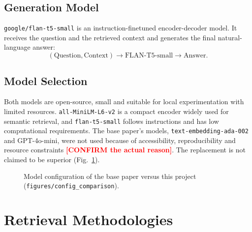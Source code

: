 \documentclass[conference]{IEEEtran}
\newcommand{\ph}[1]{\textbf{\textcolor{red}{[#1]}}}
\begin{document}
\subsection{Generation Model}
\texttt{google/flan-t5-small} \cite{hf_flan,chung2022flan,raffel2020t5} is an instruction-finetuned encoder-decoder model. It receives the question and the retrieved context and generates the final natural-language answer:
\begin{equation*}
(\text{Question},\text{Context})\rightarrow\text{FLAN-T5-small}\rightarrow\text{Answer}.
\end{equation*}

\subsection{Model Selection}
Both models are open-source, small and suitable for local experimentation with limited resources. \texttt{all-MiniLM-L6-v2} is a compact encoder widely used for semantic retrieval, and \texttt{flan-t5-small} follows instructions and has low computational requirements. The base paper's models, \texttt{text-embedding-ada-002} and GPT-4o-mini, were not used because of accessibility, reproducibility and resource constraints \ph{CONFIRM the actual reason}. The replacement is not claimed to be superior (Fig.~\ref{fig:config}).

\begin{figure}[t]
\centering
{}
\caption{Model configuration of the base paper versus this project (\texttt{figures/config\_comparison}).}
\label{fig:config}
\end{figure}

\section{Retrieval Methodologies}
\end{document}
